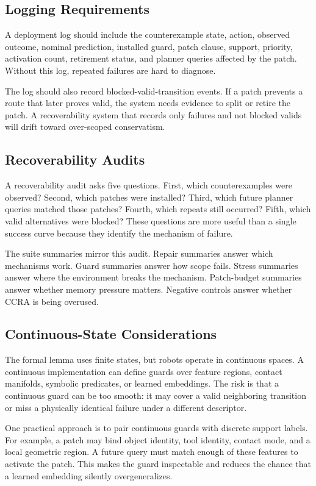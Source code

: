 \documentclass{article}
\newcommand{\ccra}{\textsc{CCRA}}
\begin{document}
\subsection{Logging Requirements}

A deployment log should include the counterexample state, action, observed
outcome, nominal prediction, installed guard, patch clause, support, priority,
activation count, retirement status, and planner queries affected by the patch.
Without this log, repeated failures are hard to diagnose.

The log should also record blocked-valid-transition events. If a patch prevents
a route that later proves valid, the system needs evidence to split or retire
the patch. A recoverability system that records only failures and not blocked
valids will drift toward over-scoped conservatism.

\subsection{Recoverability Audits}

A recoverability audit asks five questions. First, which counterexamples were
observed? Second, which patches were installed? Third, which future planner
queries matched those patches? Fourth, which repeats still occurred? Fifth,
which valid alternatives were blocked? These questions are more useful than a
single success curve because they identify the mechanism of failure.

The suite summaries mirror this audit. Repair summaries answer which mechanisms
work. Guard summaries answer how scope fails. Stress summaries answer where the
environment breaks the mechanism. Patch-budget summaries answer whether memory
pressure matters. Negative controls answer whether \ccra{} is being overused.

\subsection{Continuous-State Considerations}

The formal lemma uses finite states, but robots operate in continuous spaces. A
continuous implementation can define guards over feature regions, contact
manifolds, symbolic predicates, or learned embeddings. The risk is that a
continuous guard can be too smooth: it may cover a valid neighboring transition
or miss a physically identical failure under a different descriptor.

One practical approach is to pair continuous guards with discrete support
labels. For example, a patch may bind object identity, tool identity, contact
mode, and a local geometric region. A future query must match enough of these
features to activate the patch. This makes the guard inspectable and reduces
the chance that a learned embedding silently overgeneralizes.
\end{document}
